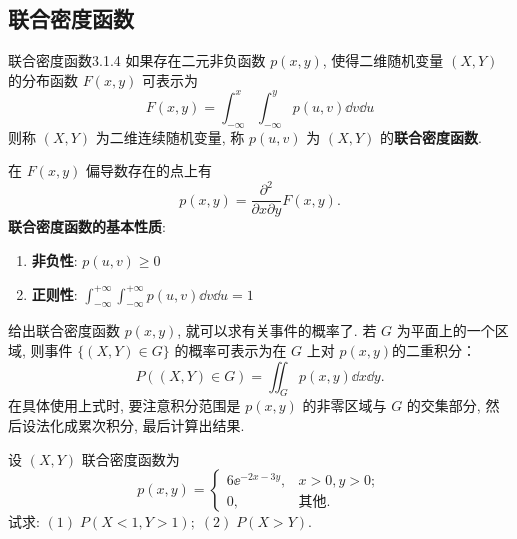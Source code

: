    \subsection{联合密度函数}\label{ssec:3.1.4}
   \begin{definition}{联合密度函数}{3.1.4}
   	如果存在二元非负函数 $p(x,y)$, 使得二维随机变量 $(X,Y)$ 的分布函数 $F(x,y)$ 可表示为
   	\begin{equation}\label{eq:3.1.3}
   	 	F(x, y)=\int_{-\infty}^{x} \int_{-\infty}^{y} p(u, v) \dd v \dd u
   	\end{equation}
   	则称 $(X,Y)$ 为二维连续随机变量, 称 $p(u,v)$ 为 $(X,Y)$ 的\textbf{联合密度函数}.
   \end{definition}
   在 $F(x,y)$ 偏导数存在的点上有
   \[
    	p(x, y)=\frac{\partial^{2}}{\partial x \partial y} F(x, y).
   \]
   \textbf{联合密度函数的基本性质}:
   \begin{enumerate}
   	\item \textbf{非负性}: $p(u,v)\geq 0$ 
   	\item \textbf{正则性}: $\int_{-\infty}^{+\infty} \int_{-\infty}^{+\infty} p(u, v) \dd v \dd u=1$
   \end{enumerate}
   给出联合密度函数 $p(x,y)$, 就可以求有关事件的概率了. 若 $G$ 为平面上的一个区域, 
   则事件 $\{(X,Y) \in G\}$ 的概率可表示为在 $G$ 上对 $p(x,y)$的二重积分：
   \begin{equation}\label{eq:3.1.4}
    	P((X, Y) \in G)=\iint_{G} p(x, y) \dd x \dd y.
   \end{equation}
   在具体使用上式时, 要注意积分范围是 $p(x,y)$ 的非零区域与 $G$ 的交集部分, 然后设法化成累次积分, 最后计算出结果.
   \begin{example}\label{exam:3.1.3}
   		设 $(X,Y)$ 联合密度函数为
   		\[
   		p(x, y)=\left\{
   		\begin{array}{cc}
   		6 \ee^{-2 x-3 y}, & x>0, y>0; \\
   		0, & \text{其他} .
   		\end{array}\right.
   		\]
   		试求: $(1)\; P(X<1,Y>1); \; (2)\; P(X>Y)$.
   \end{example}
